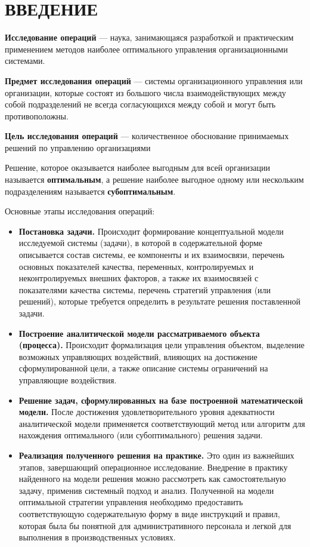\section*{ВВЕДЕНИЕ}

\textbf{Исследование операций} --- наука, занимающаяся разработкой и
практическим применением методов наиболее оптимального управления
организационными системами.

\textbf{Предмет исследования операций} --- системы организационного управления
или организации, которые состоят из большого числа взаимодействующих
между собой подразделений не всегда согласующихся между собой и могут
быть противоположны.

\textbf{Цель исследования операций} --- количественное обоснование принимаемых
решений по управлению организациями

Решение, которое оказывается наиболее выгодным для всей организации
называется \textbf{оптимальным}, а решение наиболее выгодное одному или
нескольким подразделениям называется \textbf{субоптимальным}.

Основные этапы исследования операций:

\begin{itemize}
\item \textbf{Постановка задачи.}
  Происходит формирование концептуальной модели исследуемой
  системы (задачи), в которой в содержательной форме описывается состав
  системы, ее компоненты и их взаимосвязи, перечень основных показателей
  качества, переменных, контролируемых и неконтролируемых
  внешних факторов, а также их взаимосвязей с показателями качества
  системы, перечень стратегий управления (или решений), которые требуется
  определить в результате решения поставленной задачи.
\item \textbf{Построение аналитической модели рассматриваемого объекта
    (процесса).}
  Происходит формализация цели управления
  объектом, выделение возможных управляющих воздействий, влияющих на
  достижение сформулированной цели, а также описание системы ограничений
  на управляющие воздействия.
\item \textbf{Решение задач, сформулированных на базе построенной математической модели.}
  После достижения удовлетворительного уровня адекватности
  аналитической модели применяется соответствующий метод или алгоритм для нахождения
  оптимального (или субоптимального) решения задачи.
\item \textbf{Реализация полученного решения на практике.}
  Это один из важнейших этапов, завершающий операционное исследование. Внедрение в
  практику найденного на модели решения можно рассмотреть как
  самостоятельную задачу, применив системный подход и анализ. Полученной
  на модели оптимальной стратегии управления необходимо предоставить
  соответствующую содержательную форму в виде инструкций и правил,
  которая была бы понятной для административного персонала
  и легкой для выполнения в производственных условиях.
\end{itemize}

